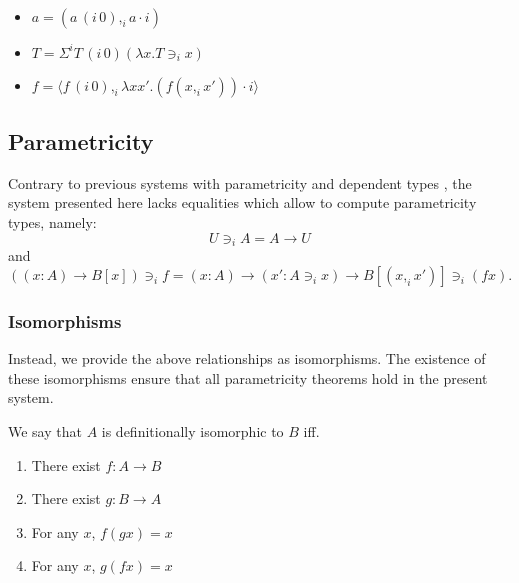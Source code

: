 \documentclass[english]{PaperTools/latex/lipics}
\newcommand\CP[3]{(#2,_{#1} #3)}
\newcommand\CSig[1]{\Sigma^{#1}}
\newcommand\param[1]{\!\cdot\!#1}
\newcommand\op[1]{∋_{#1}}
\newcommand\fp[3]{⟨#2 ,_{#1} #3⟩}
\newcommand\mor[2]{({#1}\,{#2})}
\newcommand\proj[2]{{#2}\,\mor{#1}0}
\begin{document}
\begin{corollary}~
  \begin{itemize}
  \item $a = \CP i {\proj i a} {a \param i}$
  \item $T = \CSig i {\proj i T} {(λx. T \op i x)}$
  \item $f = \fp i {\proj i f} {λx x'. (f \CP i x {x'}) \param i}$
  \end{itemize}
\end{corollary}

\subsection{Parametricity}

Contrary to previous systems with parametricity and dependent types
\citep{bernardy_proofs_2012, bernardy_computational_2012,
  bernardy_type-theory_2013}, the system presented here lacks equalities
which allow to compute parametricity types, namely:
$$U \op i A = A → U$$
and
$$((x:A) → B[x]) \op i f = (x:A) → (x' : A \op i x) → B[\CP i x {x'}] \op i (f x).$$

\subsubsection{Isomorphisms}
Instead, we provide the above relationships as isomorphisms. The
existence of these isomorphisms ensure that all parametricity theorems
hold in the present system.

We say that $A$ is definitionally isomorphic to $B$ iff.
\begin{enumerate}
  \item There exist $f : A → B$
  \item There exist $g : B → A$
  \item For any $x$, $f (g x) = x$
  \item For any $x$, $g (f x) = x$
\end{enumerate}
\end{document}
